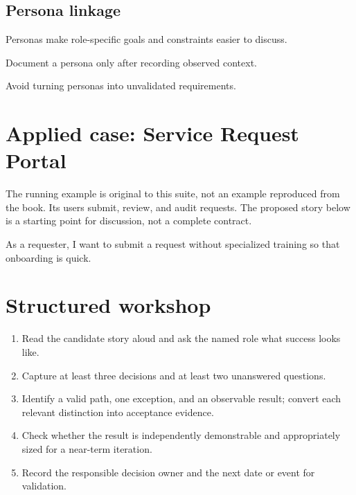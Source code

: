 \documentclass[11pt,letterpaper]{article}
\begin{document}
\subsection{Persona linkage}
Personas make role-specific goals and constraints easier to discuss.

\begin{tcolorbox}[colback=tealback,colframe=navy,title={Engineering translation},breakable]
Document a persona only after recording observed context.

\end{tcolorbox}
\begin{tcolorbox}[colback=amberback,colframe=navy,title={Failure mode to watch},breakable]
Avoid turning personas into unvalidated requirements.

\end{tcolorbox}
\section{Applied case: Service Request Portal}
The running example is original to this suite, not an example reproduced from the book. Its users submit, review, and audit requests. The proposed story below is a starting point for discussion, not a complete contract.

\begin{tcolorbox}[colback=blueback,colframe=navy,title={Candidate story},breakable]
As a requester, I want to submit a request without specialized training so that onboarding is quick.

\end{tcolorbox}
\section{Structured workshop}
\begin{enumerate}[leftmargin=*,itemsep=3pt]
\item Read the candidate story aloud and ask the named role what success looks like.
\item Capture at least three decisions and at least two unanswered questions.
\item Identify a valid path, one exception, and an observable result; convert each relevant distinction into acceptance evidence.
\item Check whether the result is independently demonstrable and appropriately sized for a near-term iteration.
\item Record the responsible decision owner and the next date or event for validation.
\end{enumerate}
\end{document}
